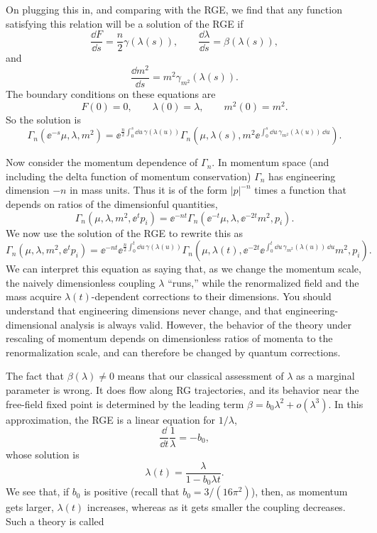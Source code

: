 On plugging this in, and comparing with the RGE, we find that any function
satisfying this relation will be a solution of the RGE if
\[
  \frac{\dd F}{\dd s}=\frac{n}{2}\gamma(\lambda(s)),
  \qquad
  \frac{\dd\lambda}{\dd s}=\beta(\lambda(s)),
\]
and
\[
  \frac{\dd m^2}{\dd s}=m^2\gamma_{m^2}(\lambda(s)).
\]
The boundary conditions on these equations are
\[
  F(0)=0,\qquad \lambda(0)=\lambda,\qquad m^2(0)=m^2.
\]
So the solution is
\[
  \Gamma_n(\ee^{-s}\mu,\lambda,m^2)
  =\ee^{\frac{n}{2}\int_0^s\dd u\,\gamma(\lambda(u))}
  \Gamma_n\!\left(\mu,\lambda(s),
  m^2\ee^{\int_0^s\dd u\,\gamma_{m^2}(\lambda(u))\,\dd u}\right).
\]

Now consider the momentum dependence of $\Gamma_n$. In momentum space (and
including the delta function of momentum conservation) $\Gamma_n$ has engineering
dimension $-n$ in mass units. Thus it is of the form $|p|^{-n}$ times a function
that depends on ratios of the dimensionful quantities,
\[
  \Gamma_n(\mu,\lambda,m^2,\ee^t p_i)
  =\ee^{-nt}\Gamma_n(\ee^{-t}\mu,\lambda,\ee^{-2t}m^2,p_i).
\]
We now use the solution of the RGE to rewrite this as
\[
  \Gamma_n(\mu,\lambda,m^2,\ee^t p_i)
  =\ee^{-nt}\ee^{\frac{n}{2}\int_0^t\dd u\,\gamma(\lambda(u))}
  \Gamma_n\!\left(\mu,\lambda(t),
  \ee^{-2t}\ee^{\int_0^t\dd u\,\gamma_{m^2}(\lambda(u))\,\dd u}m^2,p_i\right).
\]
We can interpret this equation as saying that, as we change the momentum scale,
the naively dimensionless coupling $\lambda$ ``runs,'' while the renormalized
field and the mass acquire $\lambda(t)$-dependent corrections to their
dimensions. You should understand that engineering dimensions never change,
and that engineering-dimensional analysis is always valid. However, the behavior
of the theory under rescaling of momentum depends on dimensionless ratios of
momenta to the renormalization scale, and can therefore be changed by quantum
corrections.

The fact that $\beta(\lambda)\neq0$ means that our classical assessment of
$\lambda$ as a marginal parameter is wrong. It does flow along RG trajectories,
and its behavior near the free-field fixed point is determined by the leading
term $\beta=b_0\lambda^2+o(\lambda^3)$. In this approximation, the RGE is a
linear equation for $1/\lambda$,
\[
  \frac{\dd}{\dd t}\frac{1}{\lambda}=-b_0,
\]
whose solution is
\[
  \lambda(t)=\frac{\lambda}{1-b_0\lambda t}.
\]
We see that, if $b_0$ is positive (recall that $b_0=3/(16\pi^2)$), then, as
momentum gets larger, $\lambda(t)$ increases, whereas as it gets smaller the
coupling decreases. Such a theory is called
